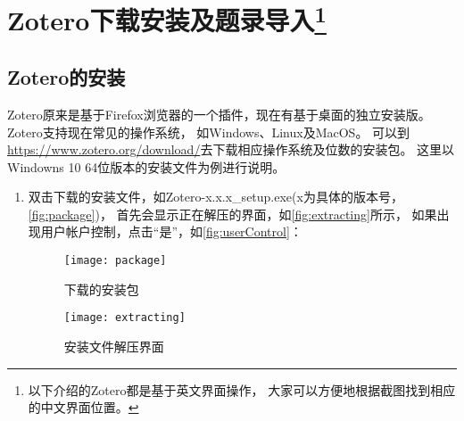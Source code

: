 \documentclass[cn,11pt,chinese]{elegantbook}
\begin{document}
\mainmatter
\chapter[Zotero下载安装及题录导入]{Zotero下载安装及题录导入\footnote{以下介绍的Zotero都是基于英文界面操作，
  		大家可以方便地根据截图找到相应的中文界面位置。}}\label{ch:install}
	\section{Zotero的安装} 
	Zotero原来是基于Firefox浏览器的一个插件，现在有基于桌面的独立安装版。Zotero支持现在常见的操作系统，
	如Windows、Linux及MacOS。
	可以到\url{https://www.zotero.org/download/}去下载相应操作系统及位数的安装包。
	这里以Windowns 10 64位版本的安装文件为例进行说明。
	\begin{enumerate}
		\item 双击下载的安装文件，如Zotero-x.x.x\_setup.exe(x为具体的版本号，\autoref{fig:package})，
		首先会显示正在解压的界面，如\autoref{fig:extracting}所示，
		如果出现用户帐户控制，点击“是”，如\autoref{fig:userControl}：
		\begin{figure}[htbp]
			\centering
			\begin{minipage}[t]{\dimexpr0.5\textwidth-4em}
				\centering
				\texttt{[image: package]}
				\caption{下载的安装包}
				\label{fig:package}
			\end{minipage}
			\begin{minipage}[t]{\dimexpr0.5\textwidth-4em}
				\centering
				\texttt{[image: extracting]}
				\caption{安装文件解压界面}
				\label{fig:extracting}
			\end{minipage}
		\end{figure}
		

\end{enumerate}
\end{document}
